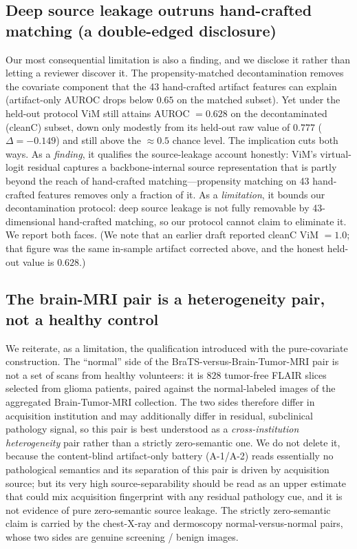 \documentclass{article}
\begin{document}
\subsection{Deep source leakage outruns hand-crafted matching (a double-edged
disclosure)}

Our most consequential limitation is also a finding, and we disclose it rather
than letting a reviewer discover it. The propensity-matched decontamination
removes the covariate component that the 43 hand-crafted artifact features can
explain (artifact-only AUROC drops below $0.65$ on the matched subset). Yet under
the held-out protocol ViM still attains AUROC $=0.628$ on the decontaminated
(cleanC) subset, down only modestly from its held-out raw value of $0.777$
($\Delta = -0.149$) and still above the $\approx 0.5$ chance level. The
implication cuts both ways. As a \emph{finding}, it qualifies the source-leakage
account honestly: ViM's virtual-logit residual captures a backbone-internal
source representation that is partly beyond the reach of hand-crafted
matching---propensity matching on 43 hand-crafted features removes only a fraction
of it. As a \emph{limitation}, it bounds our decontamination protocol: deep
source leakage is not fully removable by 43-dimensional hand-crafted matching, so
our protocol cannot claim to eliminate it. We report both faces. (We note that an
earlier draft reported cleanC ViM $=1.0$; that figure was the same in-sample
artifact corrected above, and the honest held-out value is $0.628$.)

\subsection{The brain-MRI pair is a heterogeneity pair, not a healthy control}

We reiterate, as a limitation, the qualification introduced with the
pure-covariate construction. The ``normal'' side of the
BraTS-versus-Brain-Tumor-MRI pair is not a set of scans from healthy volunteers:
it is $828$ tumor-free FLAIR slices selected from glioma patients, paired against
the normal-labeled images of the aggregated Brain-Tumor-MRI collection. The two
sides therefore differ in acquisition institution and may additionally differ in
residual, subclinical pathology signal, so this pair is best understood as a
\emph{cross-institution heterogeneity} pair rather than a strictly zero-semantic
one. We do not delete it, because the content-blind artifact-only battery
(A-1/A-2) reads essentially no pathological semantics and its separation of this
pair is driven by acquisition source; but its very high source-separability
should be read as an upper estimate that could mix acquisition fingerprint with
any residual pathology cue, and it is not evidence of pure zero-semantic source
leakage. The strictly zero-semantic claim is carried by the chest-X-ray and
dermoscopy normal-versus-normal pairs, whose two sides are genuine screening /
benign images.
\end{document}
